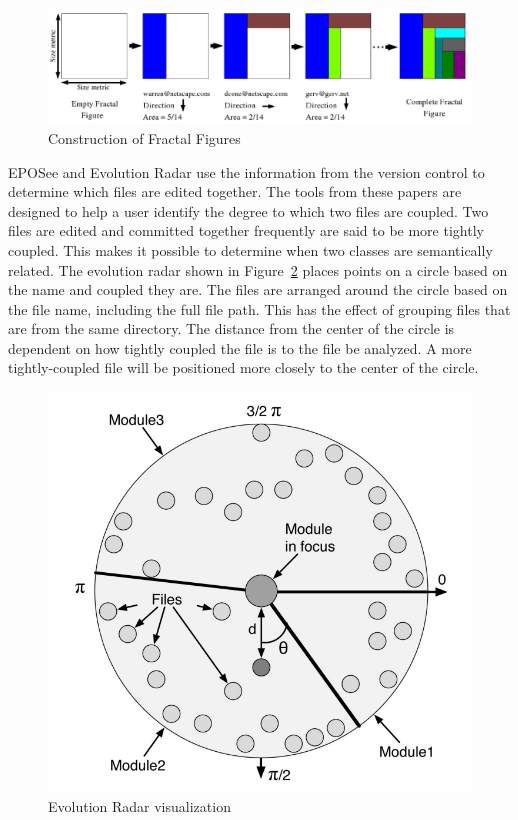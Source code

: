 \begin{figure}[htpb]
  \centering
  \includegraphics[width=0.8\linewidth]{Figures/introduction/fractal_figures.png}
  \caption{Construction of Fractal Figures}
  \label{fig:fractal_figures}
\end{figure}

EPOSee\cite{Burch2005} and Evolution Radar\cite{Ambros2009} use the
information from the version control to determine which files are edited
together. The tools from these papers are designed to help a user
identify the degree to which two files are coupled. Two files are
edited and committed together frequently are said to be more tightly
coupled. This makes it possible to determine when two classes are
semantically related. The evolution radar shown in
Figure~\ref{fig:evolution_radar} places points on a circle based on the
name and coupled they are. The files are arranged around the circle
based on the file name, including the full file path. This has the
effect of grouping files that are from the same directory. The distance
from the center of the circle is dependent on how tightly coupled the
file is to the file be analyzed. A more tightly-coupled file will be
positioned more closely to the center of the circle.

\begin{figure}[htpb]
  \centering
  \includegraphics[width=0.8\linewidth]{Figures/introduction/evo_radar.png}
  \caption{Evolution Radar visualization}
  \label{fig:evolution_radar}
\end{figure}

